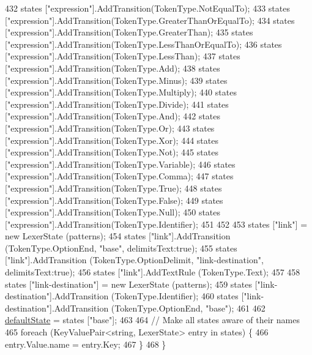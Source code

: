 \begin{DoxyCode}
432             states [\textcolor{stringliteral}{"expression"}].AddTransition(TokenType.NotEqualTo);
433             states [\textcolor{stringliteral}{"expression"}].AddTransition(TokenType.GreaterThanOrEqualTo);
434             states [\textcolor{stringliteral}{"expression"}].AddTransition(TokenType.GreaterThan);
435             states [\textcolor{stringliteral}{"expression"}].AddTransition(TokenType.LessThanOrEqualTo);
436             states [\textcolor{stringliteral}{"expression"}].AddTransition(TokenType.LessThan);
437             states [\textcolor{stringliteral}{"expression"}].AddTransition(TokenType.Add);
438             states [\textcolor{stringliteral}{"expression"}].AddTransition(TokenType.Minus);
439             states [\textcolor{stringliteral}{"expression"}].AddTransition(TokenType.Multiply);
440             states [\textcolor{stringliteral}{"expression"}].AddTransition(TokenType.Divide);
441             states [\textcolor{stringliteral}{"expression"}].AddTransition(TokenType.And);
442             states [\textcolor{stringliteral}{"expression"}].AddTransition(TokenType.Or);
443             states [\textcolor{stringliteral}{"expression"}].AddTransition(TokenType.Xor);
444             states [\textcolor{stringliteral}{"expression"}].AddTransition(TokenType.Not);
445             states [\textcolor{stringliteral}{"expression"}].AddTransition(TokenType.Variable);
446             states [\textcolor{stringliteral}{"expression"}].AddTransition(TokenType.Comma);
447             states [\textcolor{stringliteral}{"expression"}].AddTransition(TokenType.True);
448             states [\textcolor{stringliteral}{"expression"}].AddTransition(TokenType.False);
449             states [\textcolor{stringliteral}{"expression"}].AddTransition(TokenType.Null);
450             states [\textcolor{stringliteral}{"expression"}].AddTransition(TokenType.Identifier);
451 
452 
453             states [\textcolor{stringliteral}{"link"}] = \textcolor{keyword}{new} LexerState (patterns);
454             states [\textcolor{stringliteral}{"link"}].AddTransition (TokenType.OptionEnd, \textcolor{stringliteral}{"base"}, delimitsText:\textcolor{keyword}{true});
455             states [\textcolor{stringliteral}{"link"}].AddTransition (TokenType.OptionDelimit, \textcolor{stringliteral}{"link-destination"}, delimitsText:\textcolor{keyword}{true});
456             states [\textcolor{stringliteral}{"link"}].AddTextRule (TokenType.Text);
457 
458             states [\textcolor{stringliteral}{"link-destination"}] = \textcolor{keyword}{new} LexerState (patterns);
459             states [\textcolor{stringliteral}{"link-destination"}].AddTransition (TokenType.Identifier);
460             states [\textcolor{stringliteral}{"link-destination"}].AddTransition (TokenType.OptionEnd, \textcolor{stringliteral}{"base"});
461 
462             \hyperlink{a00101_a16b5dbf27a377cde5e8ba0eaa05b5710}{defaultState} = states [\textcolor{stringliteral}{"base"}];
463 
464             \textcolor{comment}{// Make all states aware of their names}
465             \textcolor{keywordflow}{foreach} (KeyValuePair<string, LexerState> entry \textcolor{keywordflow}{in} states) \{
466                 entry.Value.name = entry.Key;
467             \}
468         \}
\end{DoxyCode}
